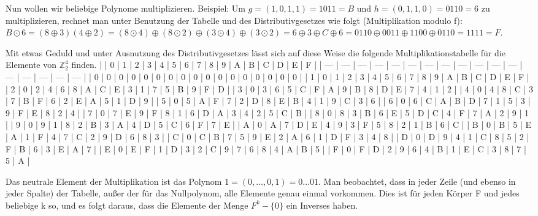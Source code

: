 \documentclass[a4paper]{article}
\begin{document}
\begin{multicols}{3}
Nun wollen wir beliebige Polynome multiplizieren. Beispiel: Um $g=(1,0,1,1)=1011=B$ und $h=(0,1,1,0)=0110=6$ zu multiplizieren, rechnet man unter Benutzung der Tabelle und des Distributivgesetzes wie folgt (Multiplikation modulo f):
$B\odot 6=(8\oplus 3)(4\oplus 2)=(8\odot 4)\oplus(8\odot 2)\oplus(3\odot 4)\oplus(3\odot 2)=6\oplus 3\oplus C\oplus 6= 0110\oplus 0011 \oplus 1100 \oplus 0110 = 1111 = F$.

Mit etwas Geduld und unter Ausnutzung des Distributivgesetzes lässt sich auf diese Weise die folgende Multiplikationstabelle für die Elemente von $\mathbb{Z}^4_2$ finden.
|     | 0   | 1   | 2   | 3   | 4   | 5   | 6   | 7   | 8   | 9   | A   | B   | C   | D   | E   | F   |
| --- | --- | --- | --- | --- | --- | --- | --- | --- | --- | --- | --- | --- | --- | --- | --- | --- |
| 0   | 0   | 0   | 0   | 0   | 0   | 0   | 0   | 0   | 0   | 0   | 0   | 0   | 0   | 0   | 0   | 0   |
| 1   | 0   | 1   | 2   | 3   | 4   | 5   | 6   | 7   | 8   | 9   | A   | B   | C   | D   | E   | F   |
| 2   | 0   | 2   | 4   | 6   | 8   | A   | C   | E   | 3   | 1   | 7   | 5   | B   | 9   | F   | D   |
| 3   | 0   | 3   | 6   | 5   | C   | F   | A   | 9   | B   | 8   | D   | E   | 7   | 4   | 1   | 2   |
| 4   | 0   | 4   | 8   | C   | 3   | 7   | B   | F   | 6   | 2   | E   | A   | 5   | 1   | D   | 9   |
| 5   | 0   | 5   | A   | F   | 7   | 2   | D   | 8   | E   | B   | 4   | 1   | 9   | C   | 3   | 6   |
| 6   | 0   | 6   | C   | A   | B   | D   | 7   | 1   | 5   | 3   | 9   | F   | E   | 8   | 2   | 4   |
| 7   | 0   | 7   | E   | 9   | F   | 8   | 1   | 6   | D   | A   | 3   | 4   | 2   | 5   | C   | B   |
| 8   | 0   | 8   | 3   | B   | 6   | E   | 5   | D   | C   | 4   | F   | 7   | A   | 2   | 9   | 1   |
| 9   | 0   | 9   | 1   | 8   | 2   | B   | 3   | A   | 4   | D   | 5   | C   | 6   | F   | 7   | E   |
| A   | 0   | A   | 7   | D   | E   | 4   | 9   | 3   | F   | 5   | 8   | 2   | 1   | B   | 6   | C   |
| B   | 0   | B   | 5   | E   | A   | 1   | F   | 4   | 7   | C   | 2   | 9   | D   | 6   | 8   | 3   |
| C   | 0   | C   | B   | 7   | 5   | 9   | E   | 2   | A   | 6   | 1   | D   | F   | 3   | 4   | 8   |
| D   | 0   | D   | 9   | 4   | 1   | C   | 8   | 5   | 2   | F   | B   | 6   | 3   | E   | A   | 7   |
| E   | 0   | E   | F   | 1   | D   | 3   | 2   | C   | 9   | 7   | 6   | 8   | 4   | A   | B   | 5   |
| F   | 0   | F   | D   | 2   | 9   | 6   | 4   | B   | 1   | E   | C   | 3   | 8   | 7   | 5   | A   |

Das neutrale Element der Multiplikation ist das Polynom $1=(0,..., 0 ,1) = 0... 01$. Man beobachtet, dass in jeder Zeile (und ebenso in jeder Spalte) der Tabelle, außer der für das Nullpolynom, alle Elemente genau einmal vorkommen. Dies ist für jeden Körper F und jedes beliebige k so, und es folgt daraus, dass die Elemente der Menge $F^k-\{0\}$ ein Inverses haben.


\end{multicols}
\end{document}
